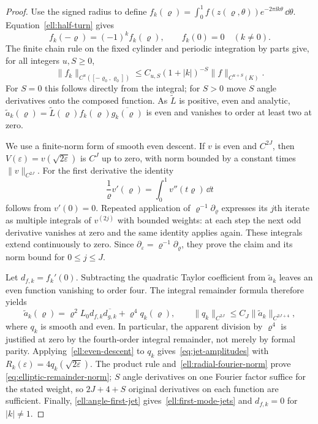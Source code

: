 \begin{proof}
Use the signed radius to define
$f_k(\varrho)=\int_0^1f(z(\varrho,\theta))e^{-2\pi\ii k\theta}\,\dd\theta$.
Equation~\eqref{ell:half-turn} gives
\[
 f_k(-\varrho)=(-1)^kf_k(\varrho),\qquad f_k(0)=0\quad(k\ne0).
\]
The finite chain rule on the fixed cylinder and periodic integration by
parts give, for all integers $u,S\geq0$,
\begin{equation}\label{ell:radial-fourier-norm}
 \|f_k\|_{C^u([-\varrho_0,\varrho_0])}
 \leq C_{u,S}(1+|k|)^{-S}\|f\|_{C^{u+S}(K)}.
\end{equation}
For $S=0$ this follows directly from the integral; for $S>0$ move $S$
angle derivatives onto the composed function.  As $\widetilde L$ is
positive, even and analytic,
$\widetilde a_k(\varrho)=\widetilde L(\varrho)
f_k(\varrho)\overline{g_k(\varrho)}$ is even and vanishes to order at
least two at zero.

We use a finite-norm form of smooth even descent.  If $v$ is even and
$C^{2J}$, then $V(\varepsilon)=v(\sqrt{2\varepsilon})$ is $C^J$ up to
zero, with norm bounded by a constant times $\|v\|_{C^{2J}}$.
For the first derivative the identity
\begin{equation}\label{ell:even-descent}
 \frac1\varrho v'(\varrho)=\int_0^1v''(t\varrho)\,\dd t
\end{equation}
follows from $v'(0)=0$.  Repeated application of
$\varrho^{-1}\partial_\varrho$ expresses its $j$th iterate as multiple
integrals of $v^{(2j)}$ with bounded weights: at each step the next odd
derivative vanishes at zero and the same identity applies again.
These integrals extend continuously to zero.  Since
$\partial_\varepsilon=\varrho^{-1}\partial_\varrho$, they prove the
claim and its norm bound for $0\leq j\leq J$.

Let $d_{f,k}=f_k'(0)$.  Subtracting the quadratic Taylor coefficient
from $\widetilde a_k$ leaves an even function vanishing to order four.
The integral remainder formula therefore yields
\[
 \widetilde a_k(\varrho)
 =\varrho^2L_0d_{f,k}\overline{d_{g,k}}
      +\varrho^4q_k(\varrho),\qquad
 \|q_k\|_{C^{2J}}
 \leq C_J\|\widetilde a_k\|_{C^{2J+4}},
\]
where $q_k$ is smooth and even.  In particular, the apparent division by
$\varrho^4$ is justified at zero by the fourth-order integral remainder,
not merely by formal parity.  Applying~\eqref{ell:even-descent} to
$q_k$ gives~\eqref{eq:jet-amplitudes} with
$R_k(\varepsilon)=4q_k(\sqrt{2\varepsilon})$.
The product rule and~\eqref{ell:radial-fourier-norm} prove
\eqref{eq:elliptic-remainder-norm}; $S$ angle derivatives on one Fourier
factor suffice for the stated weight, so $2J+4+S$ original derivatives
on each function are sufficient.  Finally,
\eqref{ell:angle-first-jet} gives~\eqref{ell:first-mode-jets} and
$d_{f,k}=0$ for $|k|\ne1$.
\end{proof}

